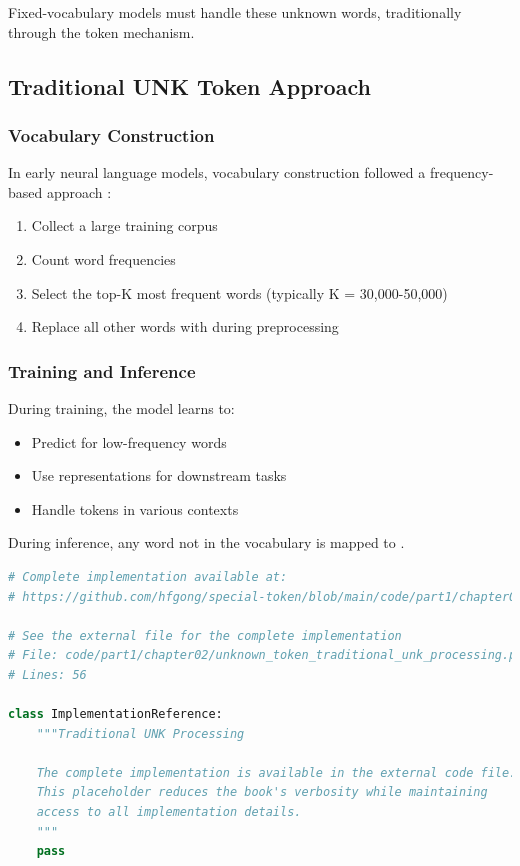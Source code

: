 Fixed-vocabulary models must handle these unknown words, traditionally through the \unk{} token mechanism.

\subsection{Traditional UNK Token Approach}

\subsubsection{Vocabulary Construction}
In early neural language models, vocabulary construction followed a frequency-based approach \citep{rogers2020primer}:

\begin{enumerate}
\item Collect a large training corpus
\item Count word frequencies
\item Select the top-K most frequent words (typically K = 30,000-50,000)
\item Replace all other words with \unk{} during preprocessing
\end{enumerate}

\subsubsection{Training and Inference}
During training, the model learns to:
\begin{itemize}
\item Predict \unk{} for low-frequency words
\item Use \unk{} representations for downstream tasks
\item Handle \unk{} tokens in various contexts
\end{itemize}

During inference, any word not in the vocabulary is mapped to \unk{}.

\begin{lstlisting}[language=Python, caption={Traditional UNK Processing}]
# Complete implementation available at:
# https://github.com/hfgong/special-token/blob/main/code/part1/chapter02/unknown_token_traditional_unk_processing.py

# See the external file for the complete implementation
# File: code/part1/chapter02/unknown_token_traditional_unk_processing.py
# Lines: 56

class ImplementationReference:
    """Traditional UNK Processing
    
    The complete implementation is available in the external code file.
    This placeholder reduces the book's verbosity while maintaining
    access to all implementation details.
    """
    pass
\end{lstlisting}

